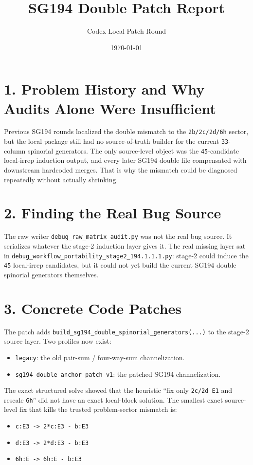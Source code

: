 \documentclass[11pt]{article}
\title{SG194 Double Patch Report}
\author{Codex Local Patch Round}
\date{\today}
\begin{document}
\maketitle

\section*{1. Problem History and Why Audits Alone Were Insufficient}
Previous SG194 rounds localized the double mismatch to the \texttt{2b/2c/2d/6h} sector, but the local package still had no source-of-truth builder for the current \texttt{33}-column spinorial generators. The only source-level object was the \texttt{45}-candidate local-irrep induction output, and every later SG194 double file compensated with downstream hardcoded merges. That is why the mismatch could be diagnosed repeatedly without actually shrinking.

\section*{2. Finding the Real Bug Source}
The raw writer \texttt{debug\_raw\_matrix\_audit.py} was not the real bug source. It serializes whatever the stage-2 induction layer gives it. The real missing layer sat in \texttt{debug\_workflow\_portability\_stage2\_194.1.1.1.py}: stage-2 could induce the \texttt{45} local-irrep candidates, but it could not yet build the current SG194 double spinorial generators themselves.

\section*{3. Concrete Code Patches}
The patch adds \texttt{build\_sg194\_double\_spinorial\_generators(...)} to the stage-2 source layer. Two profiles now exist:
\begin{itemize}
\item \texttt{legacy}: the old pair-sum / four-way-sum channelization.
\item \texttt{sg194\_double\_anchor\_patch\_v1}: the patched SG194 channelization.
\end{itemize}
The exact structured solve showed that the heuristic ``fix only \texttt{2c/2d E1} and rescale \texttt{6h}'' did not have an exact local-block solution. The smallest exact source-level fix that kills the trusted problem-sector mismatch is:
\begin{itemize}
\item \texttt{c:E3 -> 2*c:E3 - b:E3}
\item \texttt{d:E3 -> 2*d:E3 - b:E3}
\item \texttt{6h:E -> 6h:E - b:E3}
\end{itemize}
\end{document}

